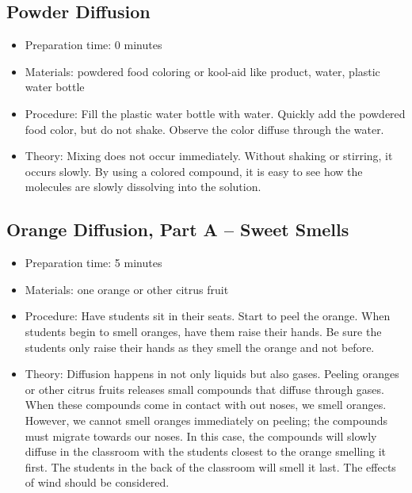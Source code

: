 \subsection{Powder Diffusion}
\begin{itemize}
\item{Preparation time: 0 minutes}
\item{Materials: powdered food coloring or kool-aid like product, water, plastic water bottle}
\item{Procedure: Fill the plastic water bottle with water. Quickly add the powdered food color, but do not shake. Observe the color diffuse through the water.}
\item{Theory: Mixing does not occur immediately. Without shaking or stirring, it occurs slowly. By using a colored compound, it is easy to see how the molecules are slowly dissolving into the solution. }
\end{itemize}

\subsection{Orange Diffusion, Part A – Sweet Smells}
\begin{itemize}
\item{Preparation time: 5 minutes}
\item{Materials: one orange or other citrus fruit}
\item{Procedure: Have students sit in their seats. Start to peel the orange. When students begin to smell oranges, have them raise their hands. Be sure the students only raise their hands as they smell the orange and not before.}
\item{Theory: Diffusion happens in not only liquids but also gases. Peeling oranges or other citrus fruits releases small compounds that diffuse through gases. When these compounds come in contact with out noses, we smell oranges. However, we cannot smell oranges immediately on peeling; the compounds must migrate towards our noses. In this case, the compounds will slowly diffuse in the classroom with the students closest to the orange smelling it first. The students in the back of the classroom will smell it last. The effects of wind should be considered.}
\end{itemize}

